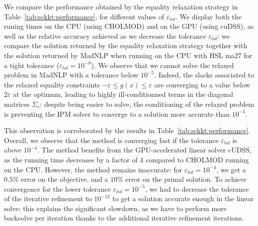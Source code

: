 We compare the performance obtained by the equality relaxation strategy
in Table~\ref{tab:sckkt:performance}, for different values of $\varepsilon_{tol}$.
We display both the runing times on the CPU (using CHOLMOD) and on the GPU
(using cuDSS), as well as the relative accuracy achieved as we decrease the tolerance
$\varepsilon_{tol}$: we compare the solution
returned by the equality relaxation strategy together
with the solution returned by MadNLP when running on the CPU
with HSL ma27 for a tight tolerance ($\varepsilon_{tol} = 10^{-8}$).
We observe that we cannot solve the relaxed problem in MadNLP
with a tolerance below $10^{-5}$. Indeed, the slacks associated
to the relaxed equality constraints $-\varepsilon \leq g(x) \leq \varepsilon$
are converging to a value below $2 \varepsilon$ at the optimum,
leading to highly ill-conditionned terms in the diagonal matrices
$\Sigma_s$: despite being easier to solve, the conditioning
of the relaxed problem is preventing the IPM solver to converge
to a solution more accurate than $10^{-5}$.

This observation is corroborated by the results in Table~\ref{tab:sckkt:performance}.
Overall, we observe that the method is converging fast
if the tolerance $\varepsilon_{tol}$ is above $10^{-4}$.
The method benefits from the GPU-accelerated linear solver cUDSS, as
the running time decreases by a factor of 4 compared to CHOLMOD
running on the CPU. However, the method remains inaccurate:
for $\varepsilon_{tol} = 10^{-4}$, we get a $0.5$\% error on the objective,
and a $10$\% error on the primal solution.
To achieve convergence for the lower tolerance $\varepsilon_{tol} = 10^{-5}$,
we had to decrease the tolerance of the iterative refinement
to $10^{-12}$ to get a solution accurate enough in the linear solve:
this explains the significant slowdown, as we have to perform more
backsolve per iteration thanks to the additional iterative refinement
iterations.

